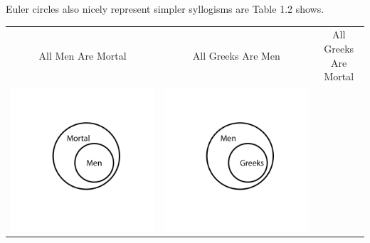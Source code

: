 \documentclass[12pt,a4paper]{report}
\begin{document}
\pagebreak
\noindent Euler circles also nicely represent simpler syllogisms are Table 1.2 shows.

\begin{table}[htb]
  \centering
  \begin{tabular}{ c  c  c }
    All Men Are Mortal & All Greeks Are Men & All Greeks Are Mortal\\
    \begin{minipage}{.29\textwidth}
      \includegraphics[scale=0.25]{EulerAllMenAreMortal}
    \end{minipage}
    &
    \begin{minipage}{.29\textwidth}
      \includegraphics[scale=0.25]{EulerAllGreeksAreMen}

\end{minipage}
\end{tabular}
\end{table}
\end{document}
